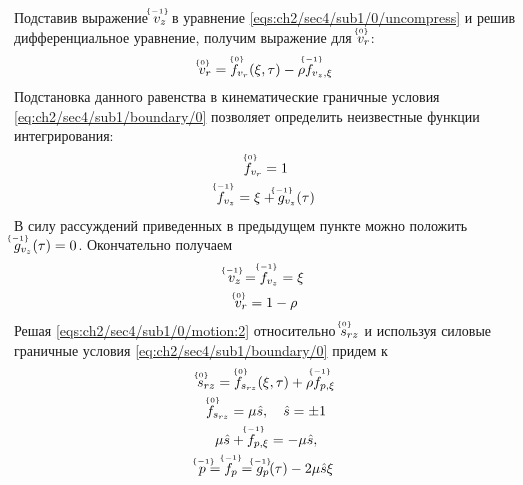 Подставив выражение $\uindex{v}{-1}_{z}$ в уравнение \cref{eqs:ch2/sec4/sub1/0/uncompress} и решив дифференциальное уравнение, получим выражение для $\uindex{v}{0}_{r}$:
\begin{equation*}
  \uindex{v}{0}_{r} = \uindex{f}{0}_{v_{r}}(\xi, \tau) -\rho \uindex{f}{-1}_{v_{z},\xi}
\end{equation*}
Подстановка данного равенства в кинематические граничные условия \cref{eq:ch2/sec4/sub1/boundary/0} позволяет определить неизвестные функции интегрирования:
\begin{gather*}
  \uindex{f}{0}_{v_{r}} = 1
  \\
  \uindex{f}{-1}_{v_{z}} = \xi + \uindex{g}{-1}_{v_{z}}(\tau)
\end{gather*}
В силу рассуждений приведенных в предыдущем пункте можно положить $\uindex{g}{-1}_{v_{z}}(\tau) = 0$. Окончательно получаем
\begin{gather}
  \label{sol:ch2/sec4/sub1/vz/-1}
  \uindex{v}{-1}_{z} = \uindex{f}{-1}_{v_{z}} = \xi
  \\
  \label{sol:ch2/sec4/sub1/vr/0}
  \uindex{v}{0}_{r} =  1 - \rho
\end{gather}
Решая \cref{eqs:ch2/sec4/sub1/0/motion:2} относительно $\uindex{s}{0}_{rz}$ и используя силовые граничные условия \cref{eq:ch2/sec4/sub1/boundary/0} придем к
\begin{gather*}
  \uindex{s}{0}_{rz} = \uindex{f}{0}_{s_{rz}}(\xi, \tau) + \rho \uindex{f}{-1}_{p,\xi}
  \\
  \uindex{f}{0}_{s_{rz}} = \mu\hat{s}, \quad \hat{s} = \pm 1
  \\
  \mu\hat{s} +\uindex{f}{-1}_{p,\xi} = -\mu \hat{s},
  \\
  \uindex{p}{-1}=\uindex{f}{-1}_{p} =\uindex{g}{-1}_{p}(\tau) -2\mu\hat{s}\xi
\end{gather*}

